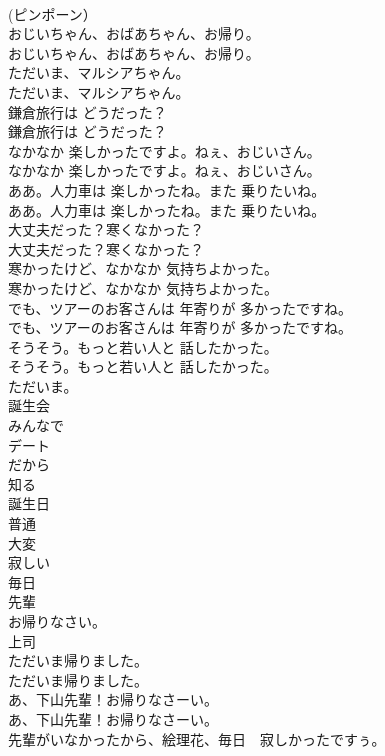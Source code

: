 \documentclass[8pt]{extreport}
\begin{document}
\begin{CJK}{UTF8}{min}
\\	(ピンポーン） 
\\	おじいちゃん、おばあちゃん、お帰り。	
\\	おじいちゃん、おばあちゃん、お帰り。 
\\	ただいま、マルシアちゃん。	
\\	ただいま、マルシアちゃん。 
\\	鎌倉旅行は どうだった？	
\\	鎌倉旅行は どうだった？ 
\\	なかなか 楽しかったですよ。ねぇ、おじいさん。	
\\	なかなか 楽しかったですよ。ねぇ、おじいさん。 
\\	ああ。人力車は 楽しかったね。また 乗りたいね。	
\\	ああ。人力車は 楽しかったね。また 乗りたいね。 
\\	大丈夫だった？寒くなかった？	
\\	大丈夫だった？寒くなかった？ 
\\	寒かったけど、なかなか 気持ちよかった。	
\\	寒かったけど、なかなか 気持ちよかった。 
\\	でも、ツアーのお客さんは 年寄りが 多かったですね。	
\\	でも、ツアーのお客さんは 年寄りが 多かったですね。 
\\	そうそう。もっと若い人と 話したかった。	
\\	そうそう。もっと若い人と 話したかった。 
\\	ただいま。
\\	誕生会
\\	みんなで
\\	デート
\\	だから
\\	知る
\\	誕生日
\\	普通
\\	大変
\\	寂しい
\\	毎日
\\	先輩
\\	お帰りなさい。
\\	上司
\\	ただいま帰りました。	
\\	ただいま帰りました。 
\\	あ、下山先輩！お帰りなさーい。	
\\	あ、下山先輩！お帰りなさーい。 
\\	先輩がいなかったから、絵理花、毎日　寂しかったですぅ。	

\end{CJK}
\end{document}
